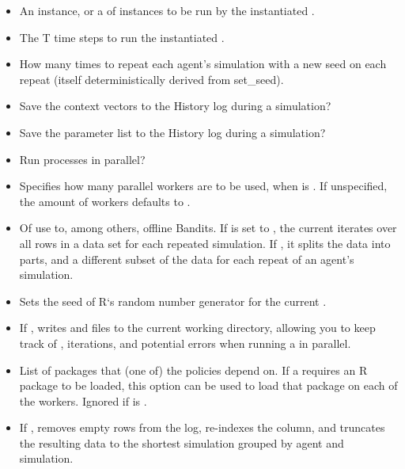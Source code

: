 \documentclass[nojss]{jss}\usepackage[]{graphicx}\usepackage[]{color}
\begin{document}
\begin{itemize}
   \item{}{
     An  instance, or a  of  instances to be run by the instantiated .
   }
   \item{}{
     The T time steps to run the instantiated .
   }
   \item{}{
     How many times to repeat each agent's simulation with a new seed on each repeat (itself deterministically derived from set\_seed).
   }
   \item{}{
     Save the context vectors  to the History log during a simulation?
   }
   \item{}{
     Save the parameter list  to the History log during a simulation?
   }
   \item{}{
      Run  processes in parallel?
   }
   \item{}{
      Specifies how many parallel workers are to be used, when  is . If unspecified, the amount of workers defaults to .
   }
   \item{}{
      Of use to, among others, offline Bandits.
      If  is set to , the current 
      iterates over all rows in a data set for each repeated simulation.
      If , it splits the data into  parts,
      and a different subset of the data for each repeat of an agent's simulation.
   }
   \item{}{
      Sets the seed of R‘s random number generator for the current .
   }
   \item{}{
       If ,  writes  and 
       files to the current working directory, allowing you to keep track of , iterations,
       and potential errors when running a  in parallel.
   }
   \item{}{
       List of packages that (one of) the policies depend on. If a  requires an
       R package to be loaded, this option can be used to load that package on each of the workers.
       Ignored if  is .
   }
   \item{}{
      If , removes empty rows from the  log,
      re-indexes the  column, and truncates the resulting data to the shortest simulation
      grouped by agent and simulation.
   }
\end{itemize}
\end{document}
